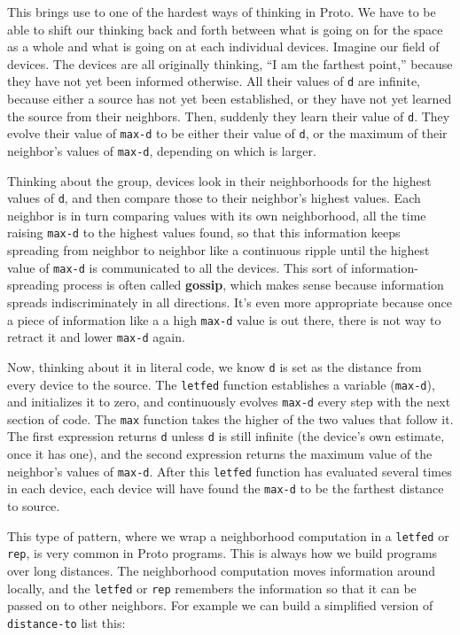 \documentclass{article}
\newcommand\var[1]{{\tt #1}}
\begin{document}
This brings use to one of the hardest ways of thinking in Proto.  We
have to be able to shift our thinking back and forth between what is
going on for the space as a whole and what is going on at each
individual devices.  Imagine our field of devices. The devices are all
originally thinking, ``I am the farthest point,'' because they have
not yet been informed otherwise.  All their values of \var{d} are
infinite, because either a source has not yet been established, or
they have not yet learned the source from their neighbors.  Then,
suddenly they learn their value of \var{d}.  They evolve their value
of \var{max-d} to be either their value of \var{d}, or the maximum of
their neighbor's values of \var{max-d}, depending on which is larger.

Thinking about the group, devices look in their neighborhoods for the
highest values of \var{d}, and then compare those to their neighbor's
highest values.  Each neighbor is in turn comparing values with its
own neighborhood, all the time raising \var{max-d} to the highest
values found, so that this information keeps spreading from neighbor
to neighbor like a continuous ripple until the highest value of
\var{max-d} is communicated to all the devices.  This sort of
information-spreading process is often called {\bf gossip}, which
makes sense because information spreads indiscriminately in all
directions.  It's even more appropriate because once a piece of
information like a a high \var{max-d} value is out there, there is not
way to retract it and lower \var{max-d} again.

Now, thinking about it in literal code, we know \var{d} is set as the
distance from every device to the source.  The \var{letfed} function
establishes a variable (\var{max-d}), and initializes it to zero, and
continuously evolves \var{max-d} every step with the next section of
code.  The \var{max} function takes the higher of the two values that
follow it.  The first expression returns \var{d} unless \var{d} is
still infinite (the device's own estimate, once it has one), and the
second expression returns the maximum value of the neighbor's values
of \var{max-d}.  After this \var{letfed} function has evaluated
several times in each device, each device will have found the
\var{max-d} to be the farthest distance to source.  

This type of pattern, where we wrap a neighborhood computation in a
\var{letfed} or \var{rep}, is very common in Proto programs.  This is
always how we build programs over long distances.  The neighborhood
computation moves information around locally, and the \var{letfed} or
\var{rep} remembers the information so that it can be passed on to
other neighbors.  For example we can build a simplified version of
\var{distance-to} list this:
\end{document}
